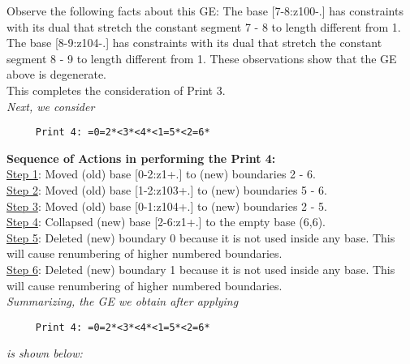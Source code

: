 \documentclass[final]{article}
\begin{document}
Observe the following facts about this GE:
The base [7-8:z100-.]  has constraints with its dual that stretch the constant segment 7 - 8 to length different from 1.  The base [8-9:z104-.]  has constraints with its dual that stretch the constant segment 8 - 9 to length different from 1.  These observations show that the GE above is degenerate.\\[0.1in]
This completes the consideration of Print 3.\\[0.1in]
{\em Next, we consider}
\begin{verbatim}
     Print 4: =0=2*<3*<4*<1=5*<2=6*
\end{verbatim}
{\bf Sequence of Actions in performing the Print 4:}\\
{\underline{Step 1}:} Moved (old) base [0-2:z1+.]  to (new) boundaries 2 - 6.\\
{\underline{Step 2}:} Moved (old) base [1-2:z103+.]  to (new) boundaries 5 - 6.\\
{\underline{Step 3}:} Moved (old) base [0-1:z104+.]  to (new) boundaries 2 - 5.\\
{\underline{Step 4}:} Collapsed (new) base [2-6:z1+.]  to the empty base (6,6).
\\
{\underline{Step 5}:} Deleted (new) boundary 0 because it is not used inside any base.  This will cause renumbering of higher numbered boundaries.
\\
{\underline{Step 6}:} Deleted (new) boundary 1 because it is not used inside any base.  This will cause renumbering of higher numbered boundaries.
\\[0.1in]
{\em Summarizing, the GE we obtain after applying}
\begin{verbatim}
     Print 4: =0=2*<3*<4*<1=5*<2=6*
\end{verbatim}
{\em is shown below:}
\end{document}
